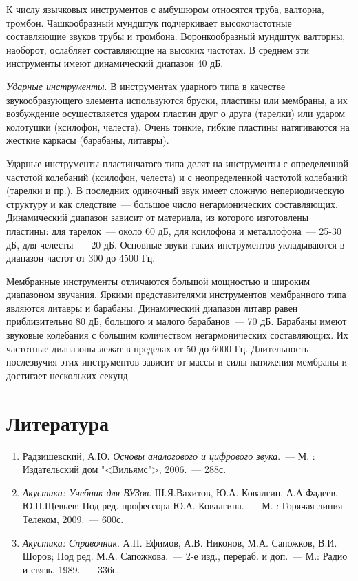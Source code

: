 \documentclass[oneside, final, 14pt]{extreport}
\begin{document}
К числу язычковых инструментов с амбушюром относятся труба, валторна, тромбон. Чашкообразный мундштук подчеркивает высокочастотные составляющие звуков трубы и тромбона. Воронкообразный мундштук валторны, наоборот, ослабляет составляющие на высоких частотах. В среднем эти инструменты имеют динамический диапазон 40 дБ.

{\itshape Ударные инструменты}. В инструментах ударного типа в качестве звукообразующего элемента используются бруски, пластины или мембраны, а их возбуждение осуществляется ударом пластин друг о друга (тарелки) или ударом колотушки (ксилофон, челеста). Очень тонкие, гибкие пластины натягиваются на жесткие каркасы (барабаны, литавры).

Ударные инструменты пластинчатого типа делят на инструменты с определенной частотой колебаний (ксилофон, челеста) и с неопределенной частотой колебаний (тарелки и пр.). В последних одиночный звук имеет сложную непериодическую структуру и как следствие~--- большое число негармонических составляющих.
Динамический диапазон зависит от материала, из которого изготовлены пластины: для тарелок~--- около 60 дБ, для ксилофона и металлофона~--- 25-30 дБ, для челесты~--- 20 дБ. Основные звуки таких инструментов укладываются в диапазон частот от 300 до 4500 Гц.

Мембранные инструменты отличаются большой мощностью и широким диапазоном звучания. Яркими представителями инструментов мембранного типа являются литавры и барабаны. Динамический диапазон литавр равен приблизительно 80 дБ, большого и малого барабанов~--- 70 дБ. Барабаны имеют звуковые колебания с большим количеством негармонических составляющих. Их частотные диапазоны лежат в пределах от 50 до 6000 Гц. Длительность послезвучия этих инструментов зависит от массы и силы натяжения мембраны и достигает нескольких секунд.

\section*{Литература}
\begin{enumerate}
\item Радзишевский, А.Ю. \emph{Основы аналогового и цифрового звука}.~--- М. : Издательский дом "<Вильямс">, 2006.~--- 288с.
\item \emph{Акустика: Учебник для ВУЗов}. Ш.Я.Вахитов, Ю.А. Ковалгин, А.А.Фадеев, Ю.П.Щевьев; Под ред. профессора Ю.А. Ковалгина.~--- М. : Горячая линия~--Телеком, 2009.~--- 600с.
\item \emph{Акустика: Справочник}. А.П. Ефимов, А.В. Никонов, М.А. Сапожков, В.И. Шоров; Под ред. М.А. Сапожкова.~--- 2-е изд., перераб. и доп.~--- М.: Радио и связь, 1989.~--- 336с.
\end{enumerate}
\end{document}
